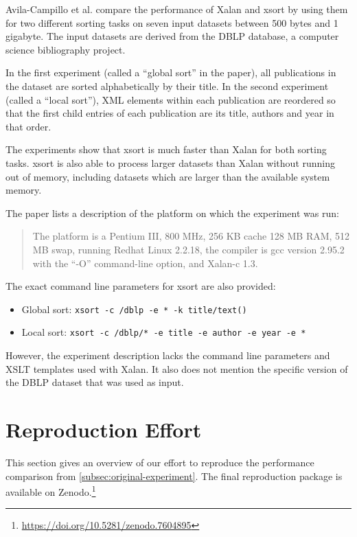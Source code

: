 \documentclass[sigconf,nonacm]{acmart}
\begin{document}
Avila-Campillo et al. compare the performance of Xalan and xsort by using them for two different sorting tasks on seven input datasets between 500 bytes and 1 gigabyte. The input datasets are derived from the DBLP database, a computer science bibliography project.

In the first experiment (called a ``global sort'' in the paper), all publications in the dataset are sorted alphabetically by their title. In the second experiment (called a ``local sort''), XML elements within each publication are reordered so that the first child entries of each publication are its title, authors and year in that order.

The experiments show that xsort is much faster than Xalan for both sorting tasks. xsort is also able to process larger datasets than Xalan without running out of memory, including datasets which are larger than the available system memory.

The paper lists a description of the platform on which the experiment was run:

\begin{quote}
    The platform is a Pentium III, 800 MHz, 256 KB cache 128 MB RAM, 512 MB swap, running Redhat Linux 2.2.18, the compiler is gcc version 2.95.2 with the “-O” command-line option, and Xalan-c 1.3.
\end{quote}

The exact command line parameters for xsort are also provided:
\begin{itemize}
    \item Global sort: \lstinline{xsort -c /dblp -e * -k title/text()}
    \item Local sort: \lstinline{xsort -c /dblp/* -e title -e author -e year -e *}
\end{itemize}

However, the experiment description lacks the command line parameters and XSLT templates used with Xalan. It also does not mention the specific version of the DBLP dataset that was used as input.



\section{Reproduction Effort}

This section gives an overview of our effort to reproduce the performance comparison from \autoref{subsec:original-experiment}. The final reproduction package is available on Zenodo.\footnote{\url{https://doi.org/10.5281/zenodo.7604895}}
\end{document}
